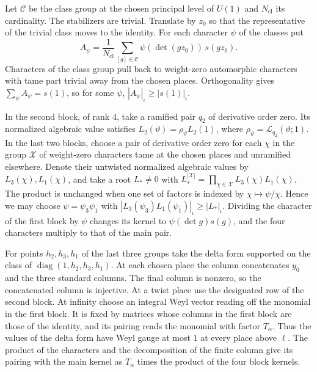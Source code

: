 Let \(\mathcal C\) be the class group at the chosen principal level of \(U(1)\)
and \(N_\mathrm{cl}\) its cardinality. The stabilizers are trivial.
Translate by \(z_0\) so that the representative of the trivial class moves
to the identity. For each character \(\psi\) of the classes put
\[
 A_\psi=\frac1{N_\mathrm{cl}}\sum_{[g]\in\mathcal C}
                 \psi(\det(gz_0))\,s(gz_0).
\]
Characters of the class group pull back to weight-zero automorphic
characters with tame part trivial away from the chosen places.
Orthogonality gives \(\sum_\psi A_\psi=s(1)\), so for some \(\psi\),
\(|A_\psi|_\iota\ge|s(1)|_\iota\).

In the second block, of rank \(4\), take a ramified pair \(q_2\) of
derivative order zero. Its normalized algebraic value satisfies
\(L_2(\vartheta)=\rho_\vartheta L_2(1)\), where
\(\rho_\vartheta=\mathcal L_{q_2}(\vartheta;1)\).
In the last two blocks, choose a pair of derivative order zero for each
\(\chi\) in the group \(\mathcal X\) of weight-zero characters tame at the
chosen places and unramified elsewhere. Denote their untwisted normalized
algebraic values by \(L_3(\chi),L_1(\chi)\), and take a root
\(L_\ast\ne0\) with \(L_\ast^{|\mathcal X|}=\prod_{\chi\in\mathcal X}L_3(\chi)L_1(\chi)\).
The product is unchanged when one set of factors is indexed by
\(\chi\mapsto\psi/\chi\). Hence we may choose \(\psi=\psi_3\psi_1\) with
\(|L_3(\psi_3)L_1(\psi_1)|_\iota\ge|L_\ast|_\iota\).
Dividing the character of the first block by \(\psi\) changes its kernel
to \(\psi(\det g)s(g)\), and the four characters multiply to that
of the main pair.

For points \(h_2,h_3,h_1\) of the last three groups take the delta form
supported on the class of \(\operatorname{diag}(1,h_2,h_3,h_1)\).
At each chosen place the column concatenates \(y_0\) and the three standard
columns. The final column is nonzero, so the concatenated column is
injective. At a twist place use the designated row of the second block.
At infinity choose an integral Weyl vector reading off the monomial
in the first block. It is fixed by matrices whose columns in the first
block are those of the identity, and its pairing reads the monomial with
factor \(T_\alpha\). Thus the values of the delta form have Weyl gauge at
most \(1\) at every place above \(\ell\).
The product of the characters and the decomposition of the finite column
give its pairing with the main kernel as \(T_\alpha\) times the product
of the four block kernels.


